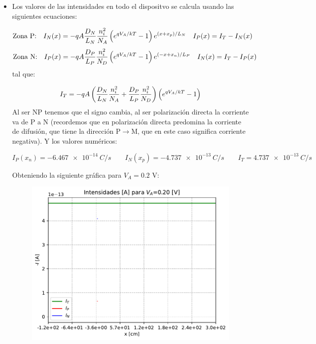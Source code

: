 \begin{itemize}
    \item Los valores de las intensidades en todo el dispositvo se calcula usando las siguientes ecuaciones: 
    
    \begin{equation*}
        \text{Zona P:} \quad 
        I_N(x) = -qA\frac{D_N}{L_N} \frac{n_i^2}{N_A}  \left( e^{qV_A/kT}-1 \right) e^{(x+x_p)/L_N} \quad I_P(x) = I_T - I_N (x)
    \end{equation*}
    \begin{equation*}
        \text{Zona N:} \quad 
        I_P(x) = - qA\frac{D_P}{L_P} \frac{n_i^2}{N_D}  \left( e^{qV_A/kT}-1 \right) e^{(-x+x_n)/L_P} \quad I_N(x) = I_T - I_P (x)
    \end{equation*}
    tal que:

    \begin{equation*}
        I_T = -qA\left( \frac{D_N}{L_N} \frac{n_i^2}{N_A}+\frac{D_P}{L_P} \frac{n_i^2}{N_D} \right)  \left( e^{q V_A/kT}-1 \right)
    \end{equation*}
    Al ser NP tenemos que el signo cambia, al ser polarización directa la corriente va de P a N (recordemos que en polarización directa predomina la corriente de difusión, que tiene la dirección P$\rightarrow$M, que en este caso significa corriente negativa). Y los valores numéricos:

    \begin{equation}
        I_P (x_n) = \SI{-6.467e-14}{C/s} \qquad 
        I_N (x_p) = \SI{-4.737e-13}{C/s} \qquad
        I_T = \SI{4.737e-13}{C/s}
    \end{equation}

    Obteniendo la siguiente gráfica para $V_A=0.2$ V: 


    \begin{figure}[h!] \centering
        \includegraphics[width=0.6\linewidth]{Cuerpo/Ch_03/03_06_02.pdf}
    \end{figure}
    
\end{itemize}

